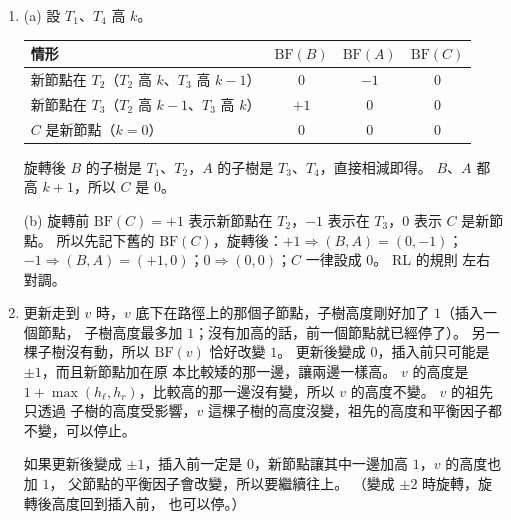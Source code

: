 \begin{enumerate}
\item (a) 設 $T_1$、$T_4$ 高 $k$。
\begin{center}
\begin{tabular}{lccc}
\toprule
情形 & $\mathrm{BF}(B)$ & $\mathrm{BF}(A)$ & $\mathrm{BF}(C)$ \\
\midrule
新節點在 $T_2$（$T_2$ 高 $k$、$T_3$ 高 $k - 1$） & $0$ & $-1$ & $0$ \\
新節點在 $T_3$（$T_2$ 高 $k - 1$、$T_3$ 高 $k$） & $+1$ & $0$ & $0$ \\
$C$ 是新節點（$k = 0$） & $0$ & $0$ & $0$ \\
\bottomrule
\end{tabular}
\end{center}
旋轉後 $B$ 的子樹是 $T_1$、$T_2$，$A$ 的子樹是 $T_3$、$T_4$，直接相減即得。 $B$、$A$
都高 $k + 1$，所以 $C$ 是 $0$。

(b) 旋轉前 $\mathrm{BF}(C) = +1$ 表示新節點在 $T_2$，$-1$ 表示在 $T_3$，$0$ 表示 $C$
是新節點。 所以先記下舊的 $\mathrm{BF}(C)$，旋轉後：$+1 \Rightarrow (B, A) = (0, -1)$；
$-1 \Rightarrow (B, A) = (+1, 0)$；$0 \Rightarrow (0, 0)$；$C$ 一律設成 $0$。 RL 的規則
左右對調。

\item 更新走到 $v$ 時，$v$ 底下在路徑上的那個子節點，子樹高度剛好加了 $1$（插入一個節點，
子樹高度最多加 $1$；沒有加高的話，前一個節點就已經停了）。 另一棵子樹沒有動，所以
$\mathrm{BF}(v)$ 恰好改變 $1$。 更新後變成 $0$，插入前只可能是 $\pm 1$，而且新節點加在原
本比較矮的那一邊，讓兩邊一樣高。 $v$ 的高度是
$1 + \max(h_\ell, h_r)$，比較高的那一邊沒有變，所以 $v$ 的高度不變。 $v$ 的祖先只透過
子樹的高度受影響，$v$ 這棵子樹的高度沒變，祖先的高度和平衡因子都不變，可以停止。

如果更新後變成 $\pm 1$，插入前一定是 $0$，新節點讓其中一邊加高 $1$，$v$ 的高度也加 $1$，
父節點的平衡因子會改變，所以要繼續往上。 （變成 $\pm 2$ 時旋轉，旋轉後高度回到插入前，
也可以停。）


\end{enumerate}
